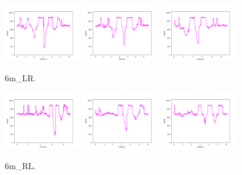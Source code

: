 \begin{figure}[!ht]
\begin{center}
\includegraphics[width=0.3\textwidth]{../data/6m_LR/6m_LR_1.png}
\includegraphics[width=0.3\textwidth]{../data/6m_LR/6m_LR_2.png}
\includegraphics[width=0.3\textwidth]{../data/6m_LR/6m_LR_3.png}
\caption{6m\_LR.\label{fig:6m_LR}}
\end{center}
\end{figure}

\begin{figure}[!ht]
\begin{center}
\includegraphics[width=0.3\textwidth]{../data/6m_RL/6m_RL_1.png}
\includegraphics[width=0.3\textwidth]{../data/6m_RL/6m_RL_2.png}
\includegraphics[width=0.3\textwidth]{../data/6m_RL/6m_RL_3.png}
\caption{6m\_RL.\label{fig:6m_RL}}
\end{center}
\end{figure}


